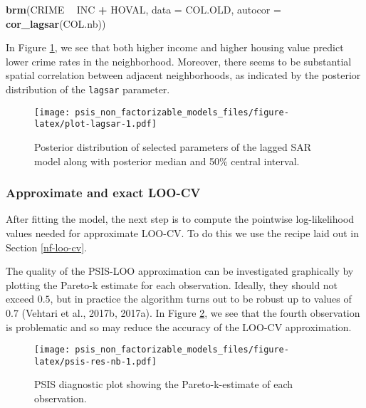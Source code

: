 \documentclass[english,,doc,floatsintext]{apa6}
\newenvironment{Shaded}{\begin{snugshade}}{\end{snugshade}}
\newcommand{\DataTypeTok}[1]{\textcolor[rgb]{0.13,0.29,0.53}{#1}}
\newcommand{\KeywordTok}[1]{\textcolor[rgb]{0.13,0.29,0.53}{\textbf{#1}}}
\newcommand{\NormalTok}[1]{#1}
\newcommand{\OperatorTok}[1]{\textcolor[rgb]{0.81,0.36,0.00}{\textbf{#1}}}
\newcommand{\StringTok}[1]{\textcolor[rgb]{0.31,0.60,0.02}{#1}}
\theoremstyle{definition}
\theoremstyle{definition}
\theoremstyle{definition}
\theoremstyle{remark}
\begin{document}
\begin{Shaded}
\begin{Highlighting}[]
\KeywordTok{brm}\NormalTok{(CRIME }\OperatorTok{~}\StringTok{ }\NormalTok{INC }\OperatorTok{+}\StringTok{ }\NormalTok{HOVAL, }\DataTypeTok{data =}\NormalTok{ COL.OLD, }\DataTypeTok{autocor =} \KeywordTok{cor_lagsar}\NormalTok{(COL.nb))}
\end{Highlighting}
\end{Shaded}

In Figure \ref{fig:plot-lagsar}, we see that both higher income and
higher housing value predict lower crime rates in the neighborhood.
Moreover, there seems to be substantial spatial correlation between
adjacent neighborhoods, as indicated by the posterior distribution of
the \texttt{lagsar} parameter.

\begin{figure}
\centering
\texttt{[image: psis\_non\_factorizable\_models\_files/figure-latex/plot-lagsar-1.pdf]}
\caption{\label{fig:plot-lagsar}Posterior distribution of selected
parameters of the lagged SAR model along with posterior median and 50\%
central interval.}
\end{figure}

\hypertarget{approximate-and-exact-loo-cv}{%
\subsubsection{Approximate and exact
LOO-CV}\label{approximate-and-exact-loo-cv}}

After fitting the model, the next step is to compute the pointwise
log-likelihood values needed for approximate LOO-CV. To do this we use
the recipe laid out in Section \ref{nf-loo-cv}.

The quality of the PSIS-LOO approximation can be investigated
graphically by plotting the Pareto-k estimate for each observation.
Ideally, they should not exceed \(0.5\), but in practice the algorithm
turns out to be robust up to values of \(0.7\) (Vehtari et al., 2017b,
2017a). In Figure \ref{fig:psis-res-nb}, we see that the fourth
observation is problematic and so may reduce the accuracy of the LOO-CV
approximation.

\begin{figure}
\centering
\texttt{[image: psis\_non\_factorizable\_models\_files/figure-latex/psis-res-nb-1.pdf]}
\caption{\label{fig:psis-res-nb}PSIS diagnostic plot showing the
Pareto-k-estimate of each observation.}
\end{figure}
\end{document}
